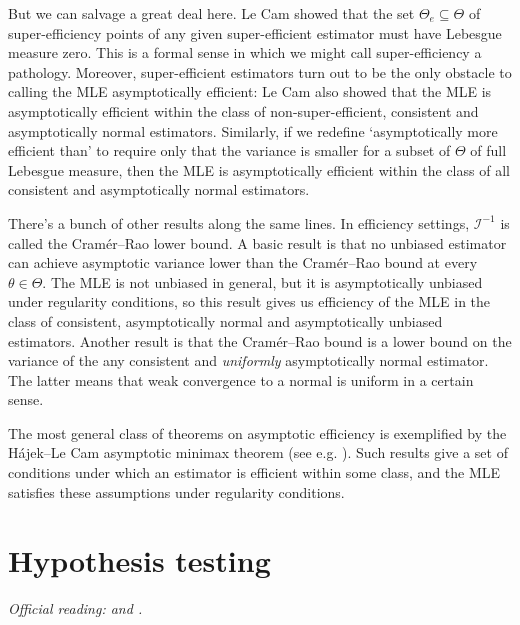 \documentclass[11pt,letterpaper,reqno,oneside]{article}
\begin{document}
But we can salvage a great deal here. Le Cam showed that the set $\Theta_e \subseteq \Theta$ of super-efficiency points of any given super-efficient estimator must have Lebesgue measure zero. This is a formal sense in which we might call super-efficiency a pathology. Moreover, super-efficient estimators turn out to be the only obstacle to calling the MLE asymptotically efficient: Le Cam also showed that the MLE is asymptotically efficient within the class of non-super-efficient, consistent and asymptotically normal estimators. Similarly, if we redefine `asymptotically more efficient than' to require only that the variance is smaller for a subset of $\Theta$ of full Lebesgue measure, then the MLE is asymptotically efficient within the class of all consistent and asymptotically normal estimators.

There's a bunch of other results along the same lines. In efficiency settings, $\mathcal{I}^{-1}$ is called the Cramér--Rao lower bound. A basic result is that no unbiased estimator can achieve asymptotic variance lower than the Cramér--Rao bound at every $\theta \in \Theta$. The MLE is not unbiased in general, but it is asymptotically unbiased under regularity conditions, so this result gives us efficiency of the MLE in the class of consistent, asymptotically normal and asymptotically unbiased estimators. Another result is that the Cramér--Rao bound is a lower bound on the variance of the any consistent and \emph{uniformly} asymptotically normal estimator. The latter means that weak convergence to a normal is uniform in a certain sense.

The most general class of theorems on asymptotic efficiency is exemplified by the Hájek--Le Cam asymptotic minimax theorem (see e.g. \textcite[][Theorem 12.1]{IbragimovHasminskii1981}). Such results give a set of conditions under which an estimator is efficient within some class, and the MLE satisfies these assumptions under regularity conditions.



\pagebreak
\section{Hypothesis testing}
\label{sec:hypothesis_testing}

\emph{%
Official reading: \textcite[][sec. 4.5.1]{Amemiya1985} and \textcite[][sec. 9]{NeweyMcfadden1994}.}
\end{document}
